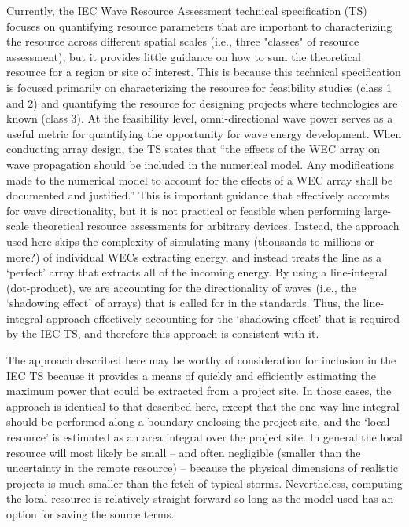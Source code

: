 Currently, the IEC Wave Resource Assessment technical specification (TS) focuses on quantifying resource parameters that are important to characterizing the resource across different spatial scales (i.e., three "classes" of resource assessment), but it provides little guidance on how to sum the theoretical resource for a region or site of interest. This is because this technical specification is focused primarily on characterizing the resource for feasibility studies (class 1 and 2) and quantifying the resource for designing projects where technologies are known (class 3). At the feasibility level, omni-directional wave power serves as a useful metric for quantifying the opportunity for wave energy development. When conducting array design, the TS states that ``the effects of the WEC array on wave propagation should be included in the numerical model. Any modifications made to the numerical model to account for the effects of a WEC array shall be documented and justified.'' This is important guidance that effectively accounts for wave directionality, but it is not practical or feasible when performing large-scale theoretical resource assessments for arbitrary devices. Instead, the approach used here skips the complexity of simulating many (thousands to millions or more?) of individual WECs extracting energy, and instead treats the line as a `perfect' array that extracts all of the incoming energy. By using a line-integral (dot-product), we are accounting for the directionality of waves (i.e., the `shadowing effect' of arrays) that is called for in the standards. Thus, the line-integral approach effectively accounting for the `shadowing effect' that is required by the IEC TS, and therefore this approach is consistent with it.

The approach described here may be worthy of consideration for inclusion in the IEC TS because it provides a means of quickly and efficiently estimating the maximum power that could be extracted from a project site. In those cases, the approach is identical to that described here, except that the one-way line-integral should be performed along a boundary enclosing the project site, and the `local resource' is estimated as an area integral over the project site. In general the local resource will most likely be small -- and often negligible (smaller than the uncertainty in the remote resource) -- because the physical dimensions of realistic projects is much smaller than the fetch of typical storms. Nevertheless, computing the local resource is relatively straight-forward so long as the model used has an option for saving the source terms.

